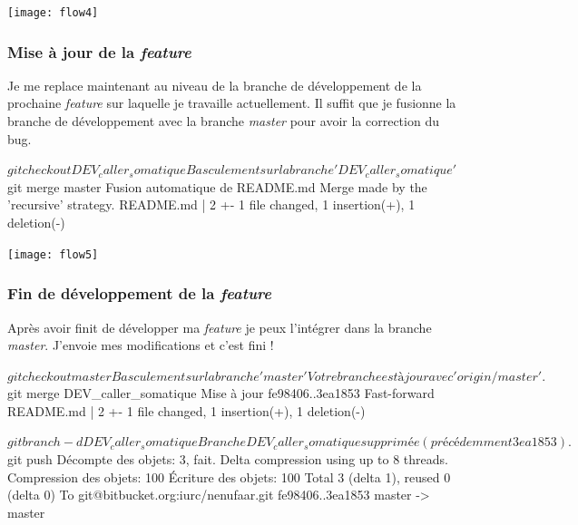 \documentclass[12pt,a4paper]{article}
\begin{document}
\texttt{[image: flow4]}

\newpage

\subsubsection{Mise à jour de la \emph{feature}}

Je me replace maintenant au niveau de la branche de développement de la prochaine \emph{feature} sur laquelle je travaille actuellement. Il suffit que je fusionne la branche de développement avec la branche \emph{master} pour avoir la correction du bug.

\vspace{1cm}

{
\begin{boxedverbatim}
$ git checkout DEV_caller_somatique 
Basculement sur la branche 'DEV_caller_somatique'

$ git merge master 
Fusion automatique de README.md
Merge made by the 'recursive' strategy.
 README.md | 2 +-
 1 file changed, 1 insertion(+), 1 deletion(-)
\end{boxedverbatim}
}

\vspace{1cm}

\texttt{[image: flow5]}

\newpage

\subsubsection{Fin de développement de la \emph{feature}}

Après avoir finit de développer ma \emph{feature} je peux l'intégrer dans la branche \emph{master}. J'envoie mes modifications et c'est fini !

\vspace{1cm}

{
\begin{boxedverbatim}
$ git checkout master 
Basculement sur la branche 'master'
Votre branche est à jour avec 'origin/master'.

$ git merge DEV_caller_somatique 
Mise à jour fe98406..3ea1853
Fast-forward
 README.md | 2 +-
 1 file changed, 1 insertion(+), 1 deletion(-)
 
 $ git branch -d DEV_caller_somatique 
Branche DEV_caller_somatique supprimée (précédemment 3ea1853).

$ git push
Décompte des objets: 3, fait.
Delta compression using up to 8 threads.
Compression des objets: 100%
Écriture des objets: 100%
Total 3 (delta 1), reused 0 (delta 0)
To git@bitbucket.org:iurc/nenufaar.git
   fe98406..3ea1853  master -> master
\end{boxedverbatim}
}
\end{document}
